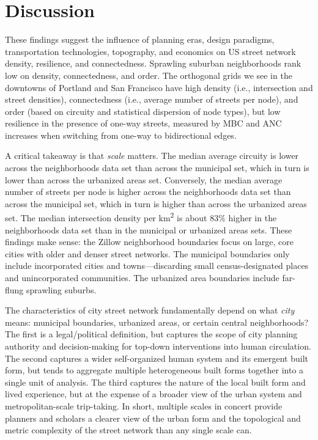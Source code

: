 \documentclass{article}
\begin{document}
\section{Discussion}

These findings suggest the influence of planning eras, design paradigms, transportation technologies, topography, and economics on US street network density, resilience, and connectedness. Sprawling suburban neighborhoods rank low on density, connectedness, and order. The orthogonal grids we see in the downtowns of Portland and San Francisco have high density (i.e., intersection and street densities), connectedness (i.e., average number of streets per node), and order (based on circuity and statistical dispersion of node types), but low resilience in the presence of one-way streets, measured by MBC and ANC increases when switching from one-way to bidirectional edges.

A critical takeaway is that \emph{scale} matters. The median average circuity is lower across the neighborhoods data set than across the municipal set, which in turn is lower than across the urbanized areas set. Conversely, the median average number of streets per node is higher across the neighborhoods data set than across the municipal set, which in turn is higher than across the urbanized areas set. The median intersection density per km\textsuperscript{2} is about 83\% higher in the neighborhoods data set than in the municipal or urbanized areas sets. These findings make sense: the Zillow neighborhood boundaries focus on large, core cities with older and denser street networks. The municipal boundaries only include incorporated cities and towns---discarding small census-designated places and unincorporated communities. The urbanized area boundaries include far-flung sprawling suburbs.

The characteristics of city street network fundamentally depend on what \emph{city} means: municipal boundaries, urbanized areas, or certain central neighborhoods? The first is a legal/political definition, but captures the scope of city planning authority and decision-making for top-down interventions into human circulation. The second captures a wider self-organized human system and its emergent built form, but tends to aggregate multiple heterogeneous built forms together into a single unit of analysis. The third captures the nature of the local built form and lived experience, but at the expense of a broader view of the urban system and metropolitan-scale trip-taking. In short, multiple scales in concert provide planners and scholars a clearer view of the urban form and the topological and metric complexity of the street network than any single scale can.
\end{document}
